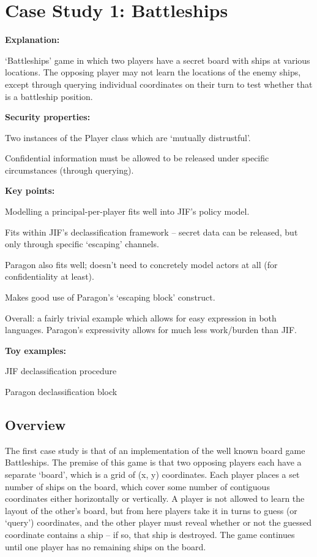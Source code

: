 \section{Case Study 1: Battleships}

\textbf{Explanation:}

`Battleships' game in which two players have a secret board with ships at various locations. The opposing player may not learn the locations of the enemy ships, except through querying individual coordinates on their turn to test whether that is a battleship position.

\textbf{Security properties:}

Two instances of the Player class which are `mutually distrustful'.

Confidential information must be allowed to be released under specific circumstances (through querying).

\textbf{Key points:}

Modelling a principal-per-player fits well into JIF's policy model.

Fits within JIF's declassification framework -- secret data can be released, but only through specific `escaping' channels.

Paragon also fits well; doesn't need to concretely model actors at all (for confidentiality at least).

Makes good use of Paragon's `escaping block' construct.

Overall: a fairly trivial example which allows for easy expression in both languages. Paragon's expressivity allows for much less work/burden than JIF.

\textbf{Toy examples:}

JIF declassification procedure

Paragon declassification block

\newpage

\subsection{Overview}

The first case study is that of an implementation of the well known board game Battleships. The premise of this game is that two opposing players each have a separate `board', which is a grid of (x, y) coordinates. Each player places a set number of ships on the board, which cover some number of contiguous coordinates either horizontally or vertically. A player is not allowed to learn the layout of the other's board, but from here players take it in turns to guess (or `query') coordinates, and the other player must reveal whether or not the guessed coordinate contains a ship -- if so, that ship is destroyed. The game continues until one player has no remaining ships on the board.

